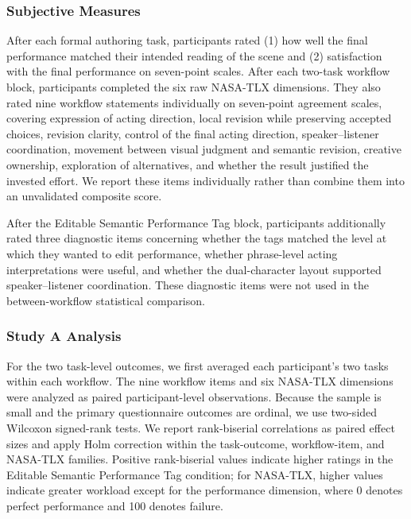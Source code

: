 \subsubsection{Subjective Measures}
After each formal authoring task, participants rated (1) how well the final
performance matched their intended reading of the scene and (2) satisfaction
with the final performance on seven-point scales. After each two-task workflow
block, participants completed the six raw NASA-TLX dimensions. They also rated
nine workflow statements individually on seven-point agreement scales,
covering expression of acting direction, local revision while preserving
accepted choices, revision clarity, control of the final acting direction,
speaker--listener coordination, movement between visual judgment and semantic
revision, creative ownership, exploration of alternatives, and whether the
result justified the invested effort. We report these items individually rather
than combine them into an unvalidated composite score.

After the Editable Semantic Performance Tag block, participants additionally
rated three diagnostic items concerning whether the tags matched the level at
which they wanted to edit performance, whether phrase-level acting
interpretations were useful, and whether the dual-character layout supported
speaker--listener coordination. These diagnostic items were not used in the
between-workflow statistical comparison.

\subsubsection{Study A Analysis}
For the two task-level outcomes, we first averaged each participant's two tasks
within each workflow. The nine workflow items and six NASA-TLX dimensions were
analyzed as paired participant-level observations. Because the sample is small
and the primary questionnaire outcomes are ordinal, we use two-sided Wilcoxon
signed-rank tests. We report rank-biserial correlations as paired effect sizes
and apply Holm correction within the task-outcome, workflow-item, and NASA-TLX
families. Positive rank-biserial values indicate higher ratings in the Editable
Semantic Performance Tag condition; for NASA-TLX, higher values indicate
greater workload except for the performance dimension, where 0 denotes perfect
performance and 100 denotes failure.

